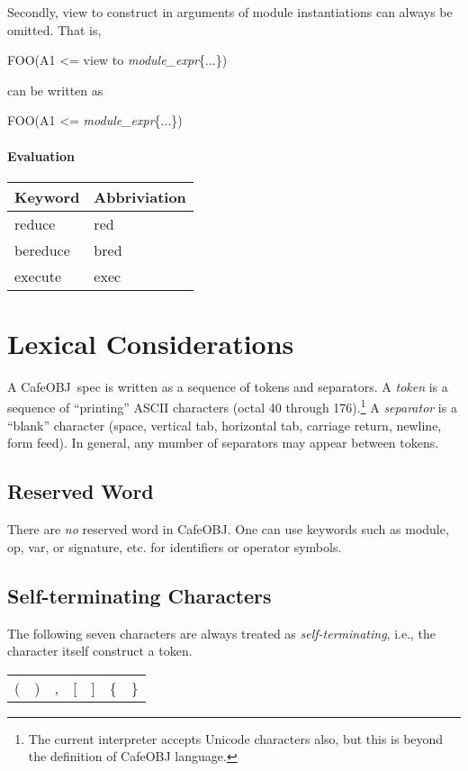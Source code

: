\documentclass[a4paper]{article}
\def\cafeobj{\textsf{CafeOBJ}}
\def\sym#1{\textsf{#1}\null}
\def\nonterm#1{\textit{#1}\null}
\begin{document}
Secondly, \sym{view to} construct in arguments of module
instantiations can always be omitted. That is,
\begin{example}
  FOO(A1 <= \sym{view to} \nonterm{module\_expr}\{...\})
\end{example}
can be written as
\begin{example}
  FOO(A1 <= \nonterm{module\_expr}\{...\})
\end{example}

\paragraph{Evaluation}
\begin{center}
\begin{tabular}{ll}\hline
Keyword & Abbriviation \\\hline
\sym{reduce} & \sym{red} \\
\sym{bereduce} & \sym{bred} \\
\sym{execute} & \sym{exec} \\\hline
\end{tabular}
\end{center}

\section{Lexical Considerations}
\label{sec:lex}
A \cafeobj\ spec is written as a sequence of tokens and separators.
A \textit{token} is a sequence of ``printing'' ASCII characters (octal
40 through 176).\footnote{The current interpreter accepts Unicode characters also, but this is beyond the definition of
  CafeOBJ language.}
A \textit{separator} is a ``blank'' character (space, vertical
tab, horizontal tab, carriage return, newline, form feed).
In general, any mumber of separators may appear between tokens. 

\subsection{Reserved Word}
\label{sec:keywords}
There are \textit{no\/} reserved word in \cafeobj.
One can use keywords such as \sym{module}, \sym{op}, \sym{var},
or \sym{signature}, etc. for identifiers or operator symbols.

\subsection{Self-terminating Characters}
\label{sec:selfterminating}
The following seven characters are always treated as \textit{self-terminating},
i.e., the character itself construct a token.
\begin{center}
\begin{tabular}{lllllll}
  \sym{(} & \sym{)} & \sym{,} & \sym{[} & \sym{]}
  & \sym{\{} & \sym{\}}
\end{tabular}
\end{center}
\end{document}
